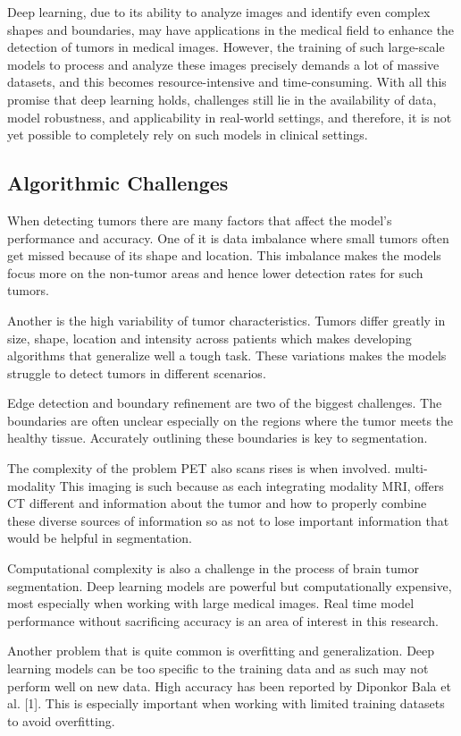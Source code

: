 \documentclass[conference]{IEEEtran}
\begin{document}
Deep learning, due to its ability to analyze images and identify even complex shapes and boundaries, may have applications in the medical field to enhance the detection of tumors in medical images. However, the training of such large-scale models to process and analyze these images precisely demands a lot of massive datasets, and this becomes resource-intensive and time-consuming. With all this promise that deep learning holds, challenges still lie in the availability of data, model robustness, and applicability in real-world settings, and therefore, it is not yet possible to completely rely on such models in clinical settings.
\subsection{Algorithmic Challenges}
When detecting tumors there are many factors that affect the model’s performance and accuracy. One of it is data imbalance where small tumors often get missed because of its shape and location. This imbalance makes the models focus more on the non-tumor areas and hence lower detection rates for such tumors.

Another is the high variability of tumor characteristics. Tumors differ greatly in size, shape, location and intensity across patients which makes developing algorithms that generalize well a tough task. These variations makes the models struggle to detect tumors in different scenarios.

Edge detection and boundary refinement are two of the biggest challenges. The boundaries are often unclear especially on the regions where the tumor meets the healthy tissue. Accurately outlining these boundaries is key to segmentation.

The complexity of the problem PET also scans rises is when involved. multi-modality This imaging is such because as each integrating modality MRI, offers CT different and information  about the tumor and how to  properly combine these diverse sources of information so as not to lose important information that would be helpful in segmentation.

Computational complexity is also a challenge in the process of brain tumor segmentation. Deep learning models are powerful but  computationally expensive, most especially when working with large medical images. Real time model performance without sacrificing accuracy is  an area of interest in this research.

Another problem that is quite common is overfitting and  generalization. Deep learning models can be too specific to the training data and as such may not perform well  on new data. High accuracy has been reported by Diponkor Bala et al.  [1]. This is  especially important when working with limited training datasets to avoid overfitting.
\end{document}
